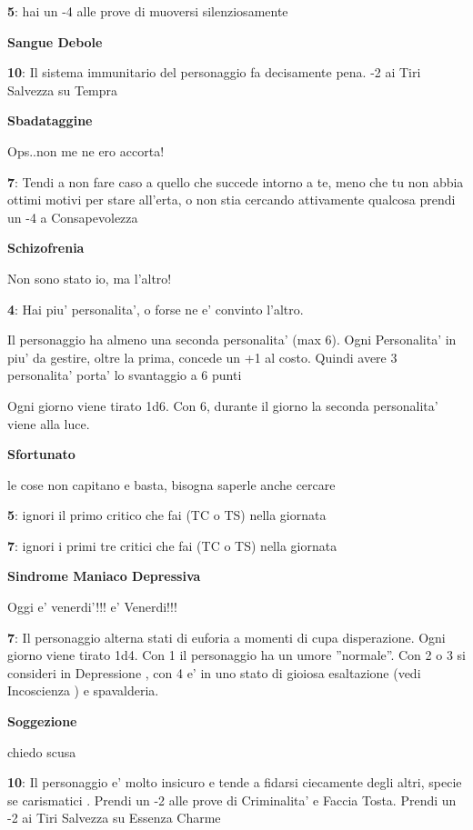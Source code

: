 \documentclass[a4paper,11pt,twoside,openany]{book}
\begin{document}
{\textbf{5}: hai un -4 alle prove di muoversi silenziosamente

\textbf{Sangue Debole}

\textbf{10}: Il sistema immunitario del personaggio fa decisamente pena. -2 ai Tiri Salvezza su Tempra

\textbf{Sbadataggine}

Ops..non me ne ero accorta!

\textbf{7}: Tendi a non fare caso a quello che succede intorno a te, meno che tu non abbia ottimi motivi per stare all'erta, o non stia cercando attivamente qualcosa prendi un -4 a Consapevolezza

\textbf{Schizofrenia}

Non sono stato io, ma l'altro!

\textbf{4}: Hai piu' personalita', o forse ne e' convinto l'altro.

Il personaggio ha almeno una seconda personalita' (max 6).
Ogni Personalita' in piu' da gestire, oltre la prima, concede un +1 al costo.
Quindi avere 3 personalita' porta' lo svantaggio a 6 punti

Ogni giorno viene tirato 1d6. Con 6, durante il giorno la seconda personalita' viene alla luce.

\textbf{Sfortunato}

le cose non capitano e basta, bisogna saperle anche cercare

\textbf{5}: ignori il primo critico che fai (TC o TS) nella giornata

\textbf{7}: ignori i primi tre critici che fai (TC o TS) nella giornata

\textbf{Sindrome Maniaco Depressiva}

Oggi e' venerdi'!!! e' Venerdi!!!

\textbf{7}: Il personaggio alterna stati di euforia a momenti di cupa disperazione. Ogni giorno viene tirato 1d4. Con 1 il personaggio ha un umore ''normale''. Con 2 o 3 si consideri in Depressione , con 4 e' in uno stato di gioiosa esaltazione (vedi Incoscienza ) e spavalderia.

\textbf{Soggezione}

chiedo scusa

\textbf{10}: Il personaggio e' molto insicuro e tende a fidarsi ciecamente degli altri, specie se carismatici . Prendi un -2 alle prove di Criminalita' e Faccia Tosta.
Prendi un -2 ai Tiri Salvezza su Essenza Charme

}
\end{document}
